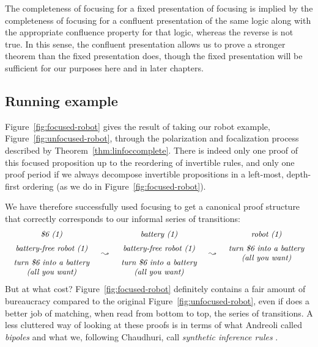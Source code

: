 The completeness of focusing for a fixed presentation of focusing is
implied by the completeness of focusing for a confluent presentation
of the same logic along with the appropriate confluence property for
that logic, whereas the reverse is not true. In this sense, the
confluent presentation allows us to prove a stronger theorem than the
fixed presentation does, though the fixed presentation will be
sufficient for our purposes here and in later chapters.

\subsection{Running example}



Figure~\ref{fig:focused-robot} gives the result of taking our 
robot example, Figure~\ref{fig:unfocused-robot}, through the 
polarization and focalization process described by 
Theorem~\ref{thm:linfoccomplete}. There is indeed only one 
proof of this focused proposition up to the reordering of 
invertible rules, and only one proof period if we always
decompose invertible propositions in a left-most, depth-first
ordering (as we do in Figure~\ref{fig:focused-robot}). 

We have therefore successfully used focusing to get a canonical
proof structure that correctly corresponds to our 
informal series of transitions:
\[
\begin{array}{ccccc}
\begin{array}{c}
\mbox{\it \$6 (1)}\medskip\\ 
\mbox{\it battery-free robot (1)} \medskip\\ 
\mbox{\it turn \$6 into a battery}\\
\mbox{\it (all you want)}
\end{array}
& \leadsto &
\begin{array}{c}
\mbox{\it battery  (1)}\medskip\\ 
\mbox{\it battery-free robot (1)} \medskip\\ 
\mbox{\it turn \$6 into a battery}\\
\mbox{\it (all you want)}
\end{array}
& \leadsto &
\begin{array}{c}
\mbox{\it robot (1)} \medskip\\ 
\mbox{\it turn \$6 into a battery}\\
\mbox{\it (all you want)}\medskip\\~\\
\end{array}
\end{array}
\]
But at what cost? Figure~\ref{fig:focused-robot} definitely contains a
fair amount of bureaucracy compared to the original
Figure~\ref{fig:unfocused-robot}, even if does a better job of
matching, when read from bottom to top, the series of transitions. A
less cluttered way of looking at these proofs is in terms of what
Andreoli called {\it bipoles} \cite{andreoli01focussing} and what we,
following Chaudhuri, call {\it synthetic inference rules}
\cite{chaudhuri08focusing}.

